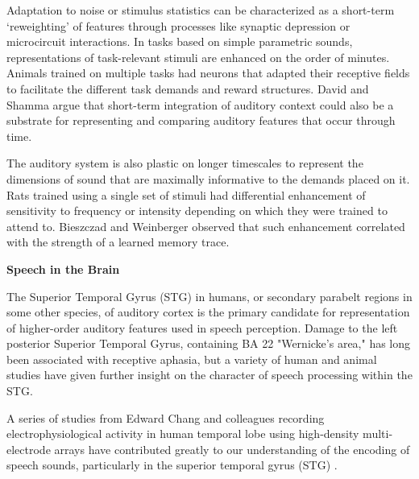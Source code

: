 Adaptation to noise or stimulus statistics can be characterized as a short-term `reweighting' of features through processes like synaptic depression\citep{mesgaraniMechanismsNoiseRobust2014,davidRapidSynapticDepression2009} or microcircuit interactions\citep{natanComplementaryControlSensory2015b,natanCorticalInterneuronsDifferentially2017}. In tasks based on simple parametric sounds, representations of task-relevant stimuli are enhanced on the order of minutes\citep{fritzRapidTaskrelatedPlasticity2003a}. Animals trained on multiple tasks had neurons that adapted their receptive fields to facilitate the different task demands\citep{fritzActiveListeningTaskdependent2005b} and reward structures\citep{davidTaskRewardStructure2012}. David and Shamma \citep{davidIntegrationMultipleTimescales2013} argue that short-term integration of auditory context could also be a substrate for representing and comparing auditory features that occur through time. 

The auditory system is also plastic on longer timescales to represent the dimensions of sound that are maximally informative to the demands placed on it. Rats trained using a single set of stimuli had differential enhancement of sensitivity to frequency or intensity depending on which they were trained to attend to\citep{Polley2006}. Bieszczad and Weinberger observed that such enhancement correlated with the strength of a learned memory trace\citep{bieszczadRepresentationalGainCortical2010}. 

\textbf{Speech in the Brain}

The Superior Temporal Gyrus (STG) in humans, or secondary parabelt regions in some other species, of auditory cortex is the primary candidate for representation of higher-order auditory features used in speech perception. Damage to the left posterior Superior Temporal Gyrus, containing BA 22 "Wernicke's area," has long been associated with receptive aphasia, but a variety of human and animal studies have given further insight on the character of speech processing within the STG.

A series of studies from Edward Chang and colleagues recording electrophysiological activity in human temporal lobe using high-density multi-electrode arrays have contributed greatly to our understanding of the encoding of speech sounds, particularly in the superior temporal gyrus (STG) \citep{yiEncodingSpeechSounds2019}. 

